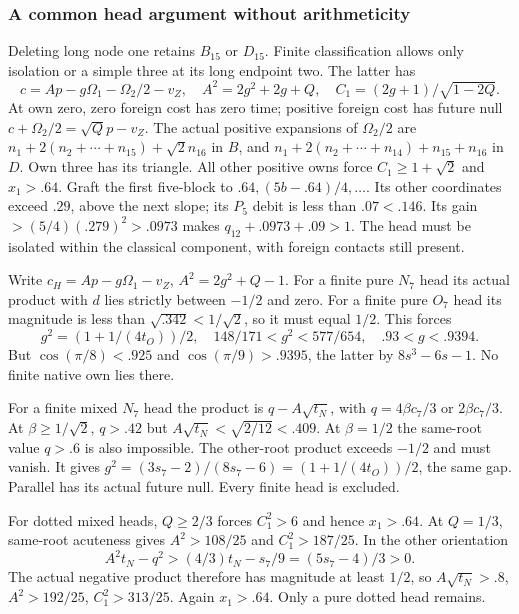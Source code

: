 \documentclass[11pt]{article}
\theoremstyle{definition}
\theoremstyle{remark}
\begin{document}
\subsubsection{A common head argument without arithmeticity}
Deleting long node one retains \(B_{15}\) or \(D_{15}\).
Finite classification allows only isolation or a simple three at
its long endpoint two. The latter has
\[
 c=Ap-g\Omega_1-\Omega_2/2-v_Z,\quad
 A^2=2g^2+2g+Q,\quad C_1=(2g+1)/\sqrt{1-2Q}.
\]
At own zero, zero foreign cost has zero time; positive foreign cost
has future null \(c+\Omega_2/2=\sqrt Qp-v_Z\).
The actual positive expansions of \(\Omega_2/2\) are
\(n_1+2(n_2+\cdots+n_{15})+\sqrt2n_{16}\) in \(B\), and
\(n_1+2(n_2+\cdots+n_{14})+n_{15}+n_{16}\) in \(D\).
Own three has its triangle. All other positive owns force
\(C_1\ge1+\sqrt2\) and \(x_1>.64\).
Graft the first five-block to \(.64,(5b-.64)/4,\ldots\).
Its other coordinates exceed \(.29\), above the next slope;
its \(P_5\) debit is less than \(.07<.146\). Its gain
\(>(5/4)(.279)^2>.0973\) makes
\(q_{12}+.0973+.09>1\). The head must be isolated within
the classical component, with foreign contacts still present.

Write \(c_H=Ap-g\Omega_1-v_Z\), \(A^2=2g^2+Q-1\).
For a finite pure \(N_7\) head its actual product with \(d\)
lies strictly between \(-1/2\) and zero. For a finite pure
\(O_7\) head its magnitude is less than \(\sqrt{.342}<1/\sqrt2\),
so it must equal \(1/2\). This forces
\[
 g^2=(1+1/(4t_O))/2,\quad148/171<g^2<577/654,
 \quad .93<g<.9394.
\]
But \(\cos(\pi/8)<.925\) and \(\cos(\pi/9)>.9395\),
the latter by \(8s^3-6s-1\). No finite native own lies there.

For a finite mixed \(N_7\) head the product is
\(q-A\sqrt{t_N}\), with
\(q=4\beta c_7/3\) or \(2\beta c_7/3\).
At \(\beta\ge1/\sqrt2\), \(q>.42\) but
\(A\sqrt{t_N}<\sqrt{2/12}<.409\). At \(\beta=1/2\)
the same-root value \(q>.6\) is also impossible. The other-root
product exceeds \(-1/2\) and must vanish. It gives
\(g^2=(3s_7-2)/(8s_7-6)=(1+1/(4t_O))/2\), the same gap.
Parallel has its actual future null. Every finite head is excluded.

For dotted mixed heads, \(Q\ge2/3\) forces \(C_1^2>6\)
and hence \(x_1>.64\). At \(Q=1/3\), same-root acuteness
gives \(A^2>108/25\) and \(C_1^2>187/25\).
In the other orientation
\[
 A^2t_N-q^2>(4/3)t_N-s_7/9=(5s_7-4)/3>0.
\]
The actual negative product therefore has magnitude at least \(1/2\),
so \(A\sqrt{t_N}>.8\), \(A^2>192/25\), \(C_1^2>313/25\).
Again \(x_1>.64\). Only a pure dotted head remains.
\end{document}
